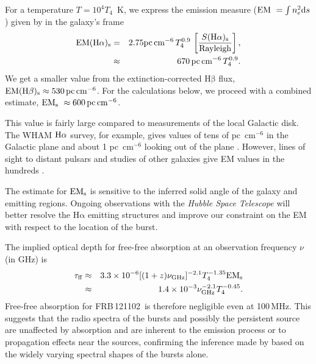 \documentclass[twocolumn]{aastex61}
\def \frb {FRB\,121102}
\def \halpha {\ensuremath{\mathrm{H\alpha}}}
\def \hbeta {\ensuremath{\mathrm{H\beta}}}
\newcommand{\be}{\begin{eqnarray}}
\newcommand{\ee}{\end{eqnarray}}
\newcommand{\Halpha}{\rm H\alpha}
\newcommand{\EM}{{\rm EM}}
\newcommand{\Ss}{S({\rm\halpha})_{\rm s}}
\newcommand{\EMs}{{\rm EM}_{\rm s}}
\newcommand{\EMsHalpha}{{\rm EM}(\halpha)_{\rm s}}
\newcommand{\EMsHbeta}{{\rm EM}(\hbeta)_{\rm s}}
\begin{document}
For a temperature  $T = 10^4 T_4$~K, we express the  emission measure ($\EM\ = \int n_e^2 \mathrm{d}s$) given by \citet{reyn77}  in the galaxy's frame
\be
\EMsHalpha &=& 2.75 \mathrm{pc\,cm^{-6}} \, T_4^{0.9}\,  \left[\frac{\Ss}{\mathrm{Rayleigh}}\right], \nonumber \\
&\approx& 670\,\mathrm{pc\,cm^{-6}}\,T_4^{0.9}.
\ee
We get a smaller  value from the extinction-corrected  $\hbeta$ flux,  $\EMsHbeta \approx 530\,\mathrm{pc\,cm^{-6}}$. For the calculations below, we proceed with a combined  estimate,  $\EMs\ \approx 600\,\mathrm{pc\,cm^{-6}}$.

This value is fairly large compared to measurements of the local Galactic disk. The WHAM  $\Halpha$ survey, for example, gives values of tens of pc~cm$^{-6}$ in the Galactic plane  and about 1 pc~cm$^{-6}$ looking out of the plane \citep[][]{hbk+08}. However, 
lines of sight to distant pulsars and studies of other galaxies give EM values in the hundreds \citep[][]{reyn77, hdb+09}. 

The estimate for $\EMs$ is sensitive to the inferred solid angle of the galaxy and emitting regions. Ongoing observations with the \textit{Hubble Space Telescope} will better resolve the $\halpha$ emitting structures and improve our constraint on the EM with respect to the location of the burst. 

 The implied optical depth for free-free absorption at an observation frequency $\nu$ (in GHz) is
 \be
\tau_{\rm ff} &\approx&  3.3\times10^{-6} [(1+z)\nu_\mathrm{GHz}]^{-2.1} T_4^{-1.35} \EMs \nonumber \\ 
&\approx& 1.4 \times 10^{-3}  \nu_\mathrm{GHz}^{-2.1} T_4^{-0.45}.
\ee
 Free-free absorption for \frb\ is therefore negligible even at 100\,MHz. This suggests that the radio spectra of the bursts and possibly the persistent source  are unaffected by absorption and are inherent to the emission process or to propagation effects near the sources, confirming the inference made by \citep{ssh+16b} based on the widely varying spectral shapes of the bursts alone.

 
 
\end{document}
